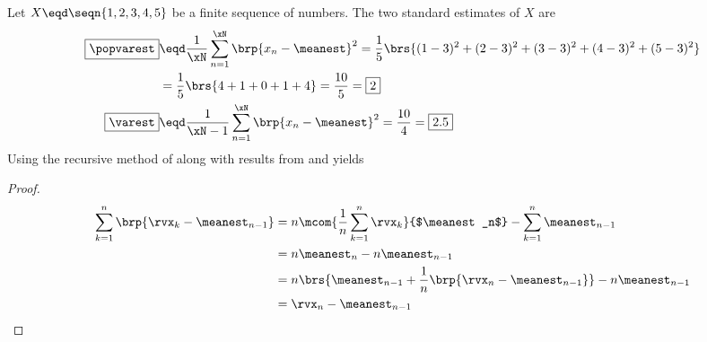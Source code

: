 \begin{example}
\label{ex:var_recursive}
Let $X \eqd \seqn{1,2,3,4,5}$ be a finite sequence of numbers.
The two standard  estimates of $X$ are
\begin{align*}
  \boxed{\popvarest} &\eqd \frac{1}{\xN}\sum_{n=1}^\xN \brp{x_n -\meanest}^2
                     =    \frac{1}{5}\brs{ (1-3)^2 + (2-3)^2 + (3-3)^2 + (4-3)^2 + (5-3)^2 }
                  \\&=    \frac{1}{5}\brs{ 4 + 1 + 0 + 1 + 4 }
                     =    \frac{10}{5}
                     =    \boxed{2}
                     \\
  \boxed{\varest} &\eqd \frac{1}{\xN-1}\sum_{n=1}^\xN \brp{x_n -\meanest}^2
                     =    \frac{10}{4}
                     =    \boxed{2.5}
\end{align*}
Using the recursive method of  along with results from
 and  yields
\end{example}

\begin{lemma}
\label{lem:meanest}
\end{lemma}
\begin{proof}
\begin{align*}
  \sum_{k=1}^n \brp{ \rvx_k - \meanest_{n-1} }
    &= n\mcom{\frac{1}{n}\sum_{k=1}^n \rvx_k}{$\meanest_n$} - \sum_{k=1}^n \meanest_{n-1}
  \\&= n\meanest_n - n\meanest_{n-1}
  \\&= n \brs{ \meanest_{n-1} + \frac{1}{n}\brp{\rvx_n - \meanest_{n-1}} } - n\meanest_{n-1}
  \\&= \rvx_n - \meanest_{n-1}
\end{align*}
\end{proof}

